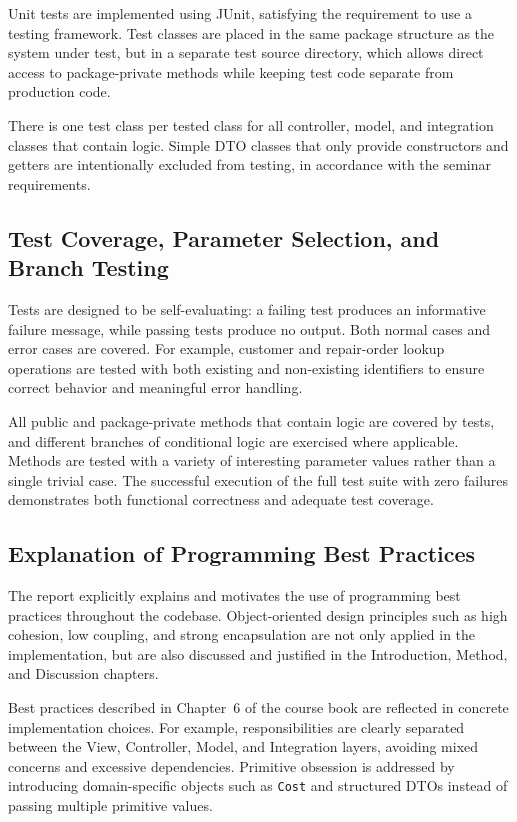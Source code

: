 \documentclass[a4paper]{scrartcl}
\begin{document}
Unit tests are implemented using JUnit, satisfying the requirement to use a testing framework. Test classes are placed in the same package structure as the system under test, but in a separate test source directory, which allows direct access to package-private methods while keeping test code separate from production code.

There is one test class per tested class for all controller, model, and integration classes that contain logic. Simple DTO classes that only provide constructors and getters are intentionally excluded from testing, in accordance with the seminar requirements.

\subsection{Test Coverage, Parameter Selection, and Branch Testing}

Tests are designed to be self-evaluating: a failing test produces an informative failure message, while passing tests produce no output. Both normal cases and error cases are covered. For example, customer and repair-order lookup operations are tested with both existing and non-existing identifiers to ensure correct behavior and meaningful error handling.

All public and package-private methods that contain logic are covered by tests, and different branches of conditional logic are exercised where applicable. Methods are tested with a variety of interesting parameter values rather than a single trivial case. The successful execution of the full test suite with zero failures demonstrates both functional correctness and adequate test coverage.

\subsection{Explanation of Programming Best Practices}

The report explicitly explains and motivates the use of programming best practices throughout the codebase. Object-oriented design principles such as high cohesion, low coupling, and strong encapsulation are not only applied in the implementation, but are also discussed and justified in the Introduction, Method, and Discussion chapters.

Best practices described in Chapter~6 of the course book are reflected in concrete implementation choices. For example, responsibilities are clearly separated between the View, Controller, Model, and Integration layers, avoiding mixed concerns and excessive dependencies. Primitive obsession is addressed by introducing domain-specific objects such as \texttt{Cost} and structured DTOs instead of passing multiple primitive values.
\end{document}
